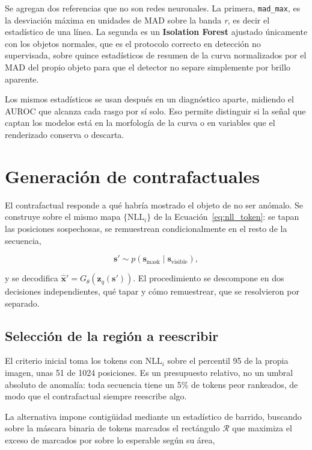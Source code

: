 Se agregan dos referencias que no son redes neuronales. La primera, \texttt{mad\_max}, es la desviación máxima en unidades de MAD sobre la banda \textit{r}, es decir el estadístico de una línea. La segunda es un \textbf{Isolation Forest} ajustado únicamente con los objetos normales, que es el protocolo correcto en detección no supervisada, sobre quince estadísticos de resumen de la curva normalizados por el MAD del propio objeto para que el detector no separe simplemente por brillo aparente.

Los mismos estadísticos se usan después en un diagnóstico aparte, midiendo el AUROC que alcanza cada rasgo por sí solo. Eso permite distinguir si la señal que captan los modelos está en la morfología de la curva o en variables que el renderizado conserva o descarta.

\section{Generación de contrafactuales}

El contrafactual responde a qué habría mostrado el objeto de no ser anómalo. Se construye sobre el mismo mapa $\{\mathrm{NLL}_i\}$ de la Ecuación~\ref{eq:nll_token}: se tapan las posiciones sospechosas, se remuestrean condicionalmente en el resto de la secuencia,

\begin{equation}
\mathbf{s}' \sim p(\mathbf{s}_{\mathrm{mask}} \mid \mathbf{s}_{\mathrm{visible}}),
\end{equation}

y se decodifica $\hat{\mathbf{x}}' = G_\theta(\mathbf{z}_q(\mathbf{s}'))$. El procedimiento se descompone en dos decisiones independientes, qué tapar y cómo remuestrear, que se resolvieron por separado.

\subsection{Selección de la región a reescribir}
\label{sec:cf_seleccion}

El criterio inicial toma los tokens con $\mathrm{NLL}_i$ sobre el percentil 95 de la propia imagen, unas 51 de 1024 posiciones. Es un presupuesto relativo, no un umbral absoluto de anomalía: toda secuencia tiene un 5\% de tokens peor rankeados, de modo que el contrafactual siempre reescribe algo.

La alternativa impone contigüidad mediante un estadístico de barrido, buscando sobre la máscara binaria de tokens marcados el rectángulo $\mathcal{R}$ que maximiza el exceso de marcados por sobre lo esperable según su área,

